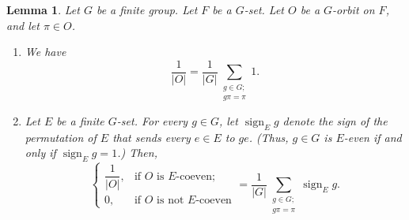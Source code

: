 \documentclass[12pt]{article}
\theoremstyle{plain}
\newtheorem{lemma}[theorem]{Lemma}
\theoremstyle{definition}
\theoremstyle{remark}
\let\sumnonlimits\sum
\renewcommand{\sum}{\sumnonlimits\limits}
\newcommand{\sign}{\operatorname{sign}}
\begin{document}
\begin{lemma}
\label{lem.burnside.sums} Let $G$ be a finite group. Let $F$ be a
$G$-set. Let $O$ be a $G$-orbit on $F$, and let $\pi\in O$.

\begin{enumerate}
\item[(a)] We have
\begin{equation}
\dfrac{1}{\left\vert O\right\vert }=\dfrac{1}{\left\vert G\right\vert }%
\sum_{\substack{g\in G;\\g\pi=\pi}}1.\label{eq.lem.burnside.sums.a}%
\end{equation}


\item[(b)] Let $E$ be a finite $G$-set. For every $g\in G$, let
$\sign_E g$ denote the sign of the permutation of $E$ that
sends every $e\in E$ to $ge$. (Thus, $g\in G$ is $E$-even if and only if
$\sign_E g = 1$.) Then,
\begin{equation}
\begin{cases}
\dfrac{1}{\left\vert O\right\vert }, & \text{if }O\text{ is }E\text{-coeven}%
;\\
0, & \text{if }O\text{ is not }E\text{-coeven}%
\end{cases}
=
\dfrac{1}{\left\vert G\right\vert }
\sum_{\substack{g\in G;\\ g\pi=\pi}} \sign_E g .
\label{eq.lem.burnside.sums.b}
\end{equation}

\end{enumerate}
\end{lemma}
\end{document}
